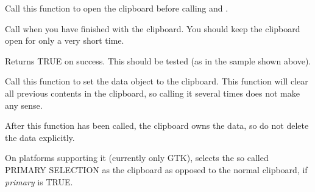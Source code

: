 \label{wxclipboardopen}


Call this function to open the clipboard before calling  
and .

Call  when you have finished with the clipboard. You
should keep the clipboard open for only a very short time.

Returns TRUE on success. This should be tested (as in the sample shown above).

\label{wxclipboardsetdata}


Call this function to set the data object to the clipboard. This function will
clear all previous contents in the clipboard, so calling it several times
does not make any sense.

After this function has been called, the clipboard owns the data, so do not delete
the data explicitly.



\label{wxclipboarduseprimary}


On platforms supporting it (currently only GTK), selects the so called
PRIMARY SELECTION as the clipboard as opposed to the normal clipboard,
if {\it primary} is TRUE.


